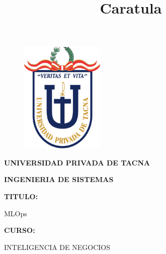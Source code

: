 \documentclass[12pt,letterpaper]{article}
\begin{document}
    \title{Caratula}
    \begin{titlepage}
        \begin{center}
            \begin{figure}[htb]
                \begin{center}
                    \includegraphics[width=4cm]{./img/logo}
                \end{center}
            \end{figure}
            \vspace*{0.15in}
            \begin{Large}
                \textbf{UNIVERSIDAD PRIVADA DE TACNA}\\
            \end{Large}
            \vspace*{0.1in}
            \begin{Large}
                \textbf{INGENIERIA DE SISTEMAS} \\
            \end{Large}
            \vspace*{0.5in}
            \begin{Large}
                \textbf{TITULO:}\\
            \end{Large}
            \vspace*{0.1in}
            \begin{Large}
                MLOps\\
            \end{Large}
            \vspace*{0.3in}
            \begin{Large}
                \textbf{CURSO:} \\
            \end{Large}
            \vspace*{0.1in}
            \begin{large}
                INTELIGENCIA DE NEGOCIOS\\

\end{large}
\end{center}
\end{titlepage}
\end{document}
